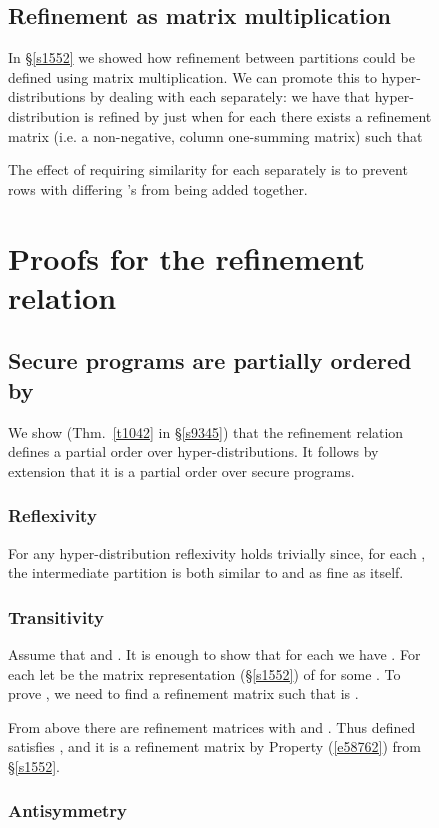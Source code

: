 \documentclass[runningheads]{llncs}
\newcommand\Sec[1] {Sec.~\ref{#1}}
\renewcommand\Sec[1] {\S\ref{#1}}
\newcommand\Eqn[1] {(\ref{#1})}
\newenvironment{Figure}[2][t]{\begin{figure}[#1]\def\Label{#2}\small}{\label{\Label}\end{figure}}
\newcommand\Thm[1] {Thm.~\ref{#1}}
\begin{document}
\begin{Figure}[ht!]{f1228}
\subsection{Refinement as matrix multiplication}

In \Sec{s1552} we showed how refinement between partitions could be defined using matrix multiplication. We can promote this to hyper-distributions by dealing with each  separately: we have that hyper-distribution  is refined by  just when for each  there exists a refinement matrix (i.e. a non-negative, column one-summing matrix)  such that

The effect of requiring similarity for each  separately is to prevent rows with differing 's from being added together.

\section{Proofs for the refinement relation}

\subsection{Secure programs are partially ordered by }\label{a2937}

We show (\Thm{t1042} in \Sec{s9345}) that the refinement relation  defines a partial order over hyper-distribut\-ions. It follows by extension that it is a partial order over secure programs.


\subsubsection{Reflexivity} For any hyper-distribution  reflexivity holds trivially since, for each , the intermediate partition  is both similar to and as fine as itself.

\subsubsection{Transitivity} Assume that  and . It is enough to show that for each  we have .
For each  let  be the  matrix representation (\Sec{s1552}) of  for some .
To prove , we need to find a refinement matrix  such that  is .

From above there are refinement matrices  with  and . Thus  defined  satisfies , and it is a refinement matrix by Property \Eqn{e58762} from \Sec{s1552}.

\subsubsection{Antisymmetry}


\end{Figure}
\end{document}

